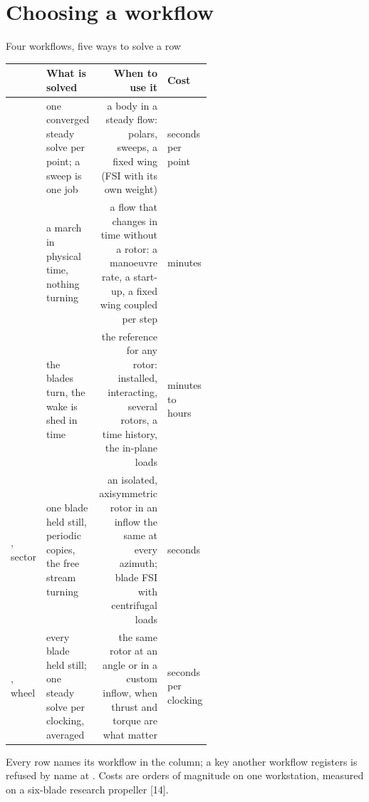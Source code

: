 %
%
%

\section{Choosing a workflow}

\begin{frame}{Four workflows, five ways to solve a row}
\relax %
{\ftstablesize\renewcommand{\arraystretch}{1.12}
\begin{tabularx}{\linewidth}{@{}P{0.17\linewidth}P{0.25\linewidth}RP{0.14\linewidth}@{}}
\toprule
\textbf{} & \textbf{What is solved} & \textbf{When to use it} & \textbf{Cost} \\
\midrule
{} & one converged steady solve per point; a sweep is one job &
  a body in a steady flow: polars, sweeps, a fixed wing (FSI with its own
  weight) & seconds per point \\
 & a march in physical time, nothing turning &
  a flow that changes in time without a rotor: a manoeuvre rate, a start-up,
  a fixed wing coupled per step & minutes \\
 & the blades turn, the wake is shed in time &
  the reference for any rotor: installed, interacting, several rotors, a
  time history, the in-plane loads & minutes to hours \\
, sector & one blade held still, periodic copies, the
  free stream turning & an isolated, axisymmetric rotor in an inflow the same
  at every azimuth; blade FSI with centrifugal loads & seconds \\
, wheel & every blade held still; one steady solve per
  clocking, averaged & the same rotor at an angle or in a custom inflow, when
  thrust and torque are what matter & seconds per clocking \\
\bottomrule
\end{tabularx}}
\par\vspace{1mm}
{\scriptsize Every row names its workflow in the  column; a key
another workflow registers is refused by name at . Costs are orders
of magnitude on one workstation, measured on a six-blade research propeller
[14].\par}
\end{frame}

